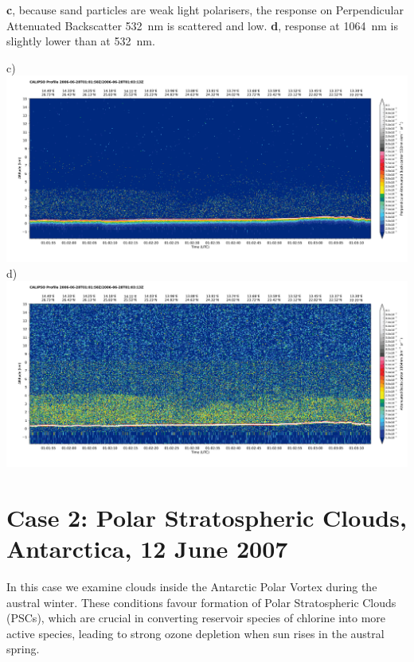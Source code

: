 \clearpage
\noindent
\textbf{c}, because sand particles are weak light polarisers, the response on Perpendicular Attenuated Backscatter \SI{532}{nm} is scattered and low.
\textbf{d}, response at \SI{1064}{nm} is slightly lower than at \SI{532}{nm}.
\vspace{3mm}

\noindent\textsf{\small c)}\\
\includegraphics[width=150mm,clip,trim=10mm 10mm 4mm 4mm]{images/sahara/1calipso532p.pdf}\\
\noindent\textsf{\small d)}\\
\includegraphics[width=150mm,clip,trim=10mm 10mm 4mm 4mm]{images/sahara/1calipso1064.pdf}

\clearpage
\section*{Case 2: Polar Stratospheric Clouds, Antarctica, 12 June 2007}
In this case we examine clouds inside the Antarctic Polar Vortex during the austral winter.
These conditions favour formation of Polar Stratospheric Clouds (PSCs),
which are crucial in converting reservoir species of chlorine into more active species,
leading to strong ozone depletion when sun rises in the austral spring.
\vspace{3mm}


